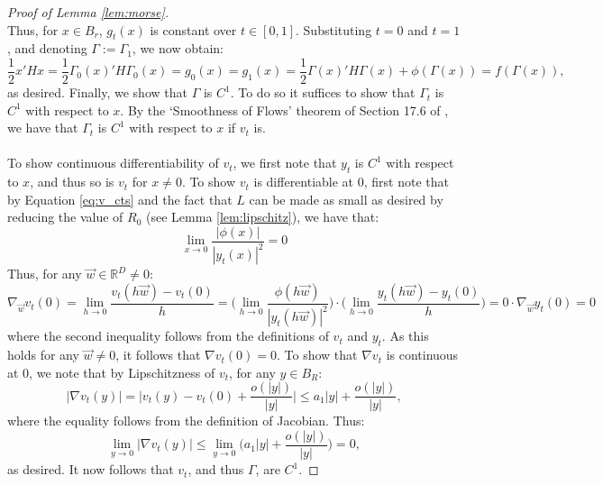 \documentclass[11pt]{article}
\newcommand{\1}{\mathbf{1}}
\theoremstyle{definition}
\theoremstyle{remark}
\begin{document}
\begin{proof}[Proof of Lemma \ref{lem:morse}]
\begin{equation}
\end{equation}
Thus, for $x \in B_r$, $g_t(x)$ is constant over $t\in[0,1]$. Substituting $t=0$ and $t=1$, and denoting $\Gamma:=\Gamma_1$, we now obtain:
\begin{equation}\nonumber
    \frac{1}{2}x'Hx = \frac{1}{2}\Gamma_0(x)'H\Gamma_0(x) =g_0(x) = g_1(x) = \frac{1}{2}\Gamma(x)'H\Gamma(x) + \phi(\Gamma(x)) = f(\Gamma(x)),
\end{equation}
as desired. Finally, we show that $\Gamma$ is $C^1$. To do so it suffices to show that $\Gamma_t$ is $C^1$ with respect to $x$. By the `Smoothness of Flows' theorem of Section 17.6 of \cite{hirsch2004differential}, we have that $\Gamma_t$ is $C^1$ with respect to $x$ if $v_t$ is.\\
\\
To show continuous differentiability of $v_t$, we first note that $y_t$ is $C^1$ with respect to $x$, and thus so is $v_t$ for $x \neq 0$. To show $v_t$ is differentiable at $0$, first note that by Equation \ref{eq:v_cts} and the fact that $L$ can be made as small as desired by reducing the value of $R_0$ (see Lemma \ref{lem:lipschitz}), we have that:
\begin{equation}\nonumber
    \lim_{x\rightarrow 0} \frac{|\phi(x)|}{|y_t(x)|^2}=0
\end{equation}
Thus, for any $\vec{w}\in\mathbb{R}^{D}\neq 0$:
\begin{equation}\nonumber
    \nabla_{\vec{w}} v_t(0) = \lim_{h\rightarrow 0}\frac{v_t(h\vec{w})-v_t(0)}{h} = \bigg(\lim_{h\rightarrow 0 } \frac{\phi(h\vec{w})}{|y_t(h\vec{w})|^2}\bigg)\cdot \bigg(\lim_{h\rightarrow 0 } \frac{y_t(h\vec{w})-y_t(0)}{h}\bigg) = 0 \cdot \nabla_{\vec{w}} y_t(0) = 0
\end{equation}
where the second inequality follows from the definitions of $v_t$ and $y_t$. As this holds for any $\vec{w}\neq 0$, it follows that $\nabla v_t(0)=0$. To show that $\nabla v_t$ is continuous at $0$, we note that by Lipschitzness of $v_t$, for any $y\in B_{R}$:
\begin{equation}\nonumber
    |\nabla v_t (y)| = \bigg|v_t(y)-v_t(0)+ \frac{o(|y|)}{|y|}\bigg| \leq a_1 |y|+ \frac{o(|y|)}{|y|},
\end{equation}
where the equality follows from the definition of Jacobian. Thus:
\begin{equation}\nonumber
    \lim_{y\rightarrow 0}|\nabla v_t (y)| \leq \lim_{y\rightarrow 0} \bigg(a_1 |y| + \frac{o(|y|)}{|y|}\bigg)=0,
\end{equation}
as desired. It now follows that $v_t$, and thus $\Gamma$, are $C^1$.
\end{proof}
\end{document}

